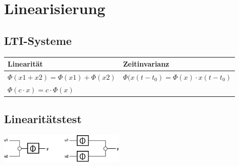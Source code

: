 \section{Linearisierung }
	\begin{minipage}[c]{10cm}
		\subsection{LTI-Systeme }
			\renewcommand{\arraystretch}{1.5}
			\begin{tabular}{|l|l|}
				\hline
				\textbf{Linearität} & \textbf{Zeitinvarianz}\\
				\hline
				$\Phi(x1+x2)=\Phi(x1)+\Phi(x2)$ & $\Phi(x(t-t_0)=\Phi(x)\cdot x(t-t_0)$ \\
				$\Phi(c\cdot x)=c\cdot \Phi(x)$ & \\
				\hline    
			\end{tabular}
			\renewcommand{\arraystretch}{1}
		\end{minipage}
		\begin{minipage}[c]{6cm}
			\subsection{Linearitätstest }
			\includegraphics[width=6cm]{bilder/linearitaetstest}
		\end{minipage}
	  	
